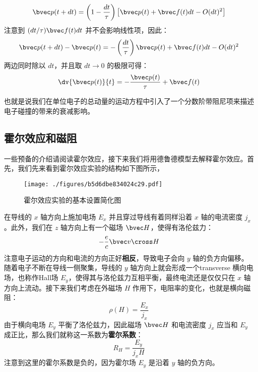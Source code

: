 \begin{equation}
\bvec p(t+dt)=\left(1-\frac{dt}{\tau}\right)\left[\bvec p(t)+\bvec f(t)dt - O(dt)^2\right]
\end{equation}
注意到 $(dt/\tau)\bvec f(t)dt$ 并不会影响线性项，因此：
\begin{equation}
\bvec p(t+dt)-\bvec p(t)=-\left(\frac{dt}{\tau}\right)\bvec p(t)+\bvec f(t)dt - O(dt)^2
\end{equation}
两边同时除以 $dt$，并且取 $dt\rightarrow 0$ 的极限可得：
\begin{equation}\label{eq_DrudeM_3}
\dv{\bvec p(t)}{t}= -\frac{\bvec p(t)}{\tau}+\bvec f(t)
\end{equation}

也就是说我们在单位电子的总动量的运动方程中引入了一个分数阶带阻尼项来描述电子碰撞的带来的衰减影响。
\subsection{霍尔效应和磁阻}
一些预备的介绍请阅读霍尔效应，接下来我们将用德鲁德模型去解释霍尔效应。首先，我们先来看到霍尔效应实验的结构如下图所示，
\begin{figure}[ht]
\centering
\texttt{[image: ./figures/b5d6dbe834024c29.pdf]}
\caption{霍尔效应实验的基本设置简化图} \label{fig_DrudeM_2}
\end{figure}
在导线的 $x$ 轴方向上施加电场 $E_x$ 并且穿过导线有着同样沿着 $x$ 轴的电流密度 $j_x$。此外，我们在 $z$ 轴方向上有一个磁场 $\bvec H$，使得有洛伦兹力：
\begin{equation}
-\frac{e}{c}\bvec v \cross H
\end{equation}
注意电子运动的方向和电流的方向正好\textbf{相反}，导致电子会向 $y$ 轴的负方向偏移。随着电子不断在导线一侧聚集，导线的 $y$ 轴方向上就会形成一个transverse 横向电场，也称作Hall场 $E_y$，使得其与洛伦兹力互相平衡，最终电流还是仅仅只在 $x$ 轴方向上流动。接下来我们考虑在外磁场 $H$ 作用下，电阻率的变化，也就是横向磁阻：
\begin{equation}
\rho(H)=\frac{E_x}{j_x}
\end{equation}
由于横向电场 $E_y$ 平衡了洛伦兹力，因此磁场 $\bvec H$ 和电流密度 $j_x$ 应当和 $E_y$ 成正比，那么我们就称这一系数为\textbf{霍尔系数}：
\begin{equation}\label{eq_DrudeM_5}
R_H = \frac{E_y}{j_xH}
\end{equation}
注意到这里的霍尔系数是负的，因为霍尔场 $E_y$ 是沿着 $y$ 轴的负方向。

